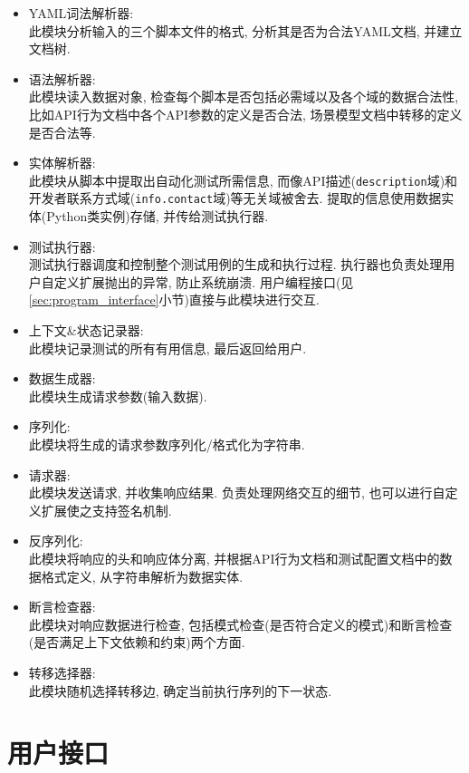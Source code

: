 	    \begin{itemize}
	        \item YAML词法解析器:\\
	            此模块分析输入的三个脚本文件的格式, 分析其是否为合法YAML文档, 并建立文档树.
	        \item 语法解析器:\\
	            此模块读入数据对象, 检查每个脚本是否包括必需域以及各个域的数据合法性, 比如API行为文档中各个API参数的定义是否合法, 场景模型文档中转移的定义是否合法等.
	        \item 实体解析器:\\
	            此模块从脚本中提取出自动化测试所需信息, 而像API描述(\texttt{description}域)和开发者联系方式域(\texttt{info.contact}域)等无关域被舍去. 提取的信息使用数据实体(Python类实例)存储, 并传给测试执行器.
	        \item 测试执行器:\\
	            测试执行器调度和控制整个测试用例的生成和执行过程. 执行器也负责处理用户自定义扩展抛出的异常, 防止系统崩溃. 用户编程接口(见\ref{sec:program_interface}小节)直接与此模块进行交互.
	        \item 上下文\&状态记录器:\\
	            此模块记录测试的所有有用信息, 最后返回给用户.
	        \item 数据生成器:\\
	            此模块生成请求参数(输入数据).
	        \item 序列化:\\
	            此模块将生成的请求参数序列化/格式化为字符串.
	        \item 请求器:\\
	            此模块发送请求, 并收集响应结果. 负责处理网络交互的细节, 也可以进行自定义扩展使之支持签名机制.
	        \item 反序列化:\\
	            此模块将响应的头和响应体分离, 并根据API行为文档和测试配置文档中的数据格式定义, 从字符串解析为数据实体.
	        \item 断言检查器:\\
	            此模块对响应数据进行检查, 包括模式检查(是否符合定义的模式)和断言检查(是否满足上下文依赖和约束)两个方面.
	        \item 转移选择器:\\
	            此模块随机选择转移边, 确定当前执行序列的下一状态.
	    \end{itemize}

	\section{用户接口}
